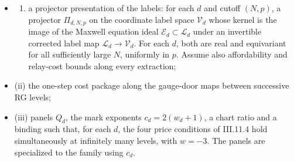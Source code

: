 \documentclass[
  letterpaper,
  11pt]{article}
\providecommand{\tightlist}{%
  \setlength{\itemsep}{0pt}\setlength{\parskip}{0pt}}
\begin{document}
\begin{itemize}
\tightlist
\item
  \begin{enumerate}
  \def\labelenumi{(\roman{enumi})}
  \tightlist
  \item
    a projector presentation of the labels: for each \(d\) and cutoff
    \((N,p)\), a projector \(\Pi_{d,N,p}\) on the coordinate label space
    \(\mathcal V_d\) whose kernel is the image of the Maxwell equation
    ideal \(\mathcal E_d\subset\mathcal L_d\) under an invertible
    corrected label map \(\mathcal L_d\to\mathcal V_d\). For each \(d\),
    both are real and equivariant for all sufficiently large \(N\),
    uniformly in \(p\). Assume also affordability and relay-cost bounds
    along every extraction;
  \end{enumerate}
\item
  (ii) the one-step cost package along the gauge-door maps between
  successive RG levels;
\item
  (iii) panels \(Q_d\), the mark exponents \(c_d=2(w_d+1)\), a chart
  ratio and a binding such that, for each \(d\), the four price
  conditions of III.11.4 hold simultaneously at infinitely many levels,
  with \(w=-3\). The panels are specialized to the family using \(c_d\).
\end{itemize}
\end{document}
